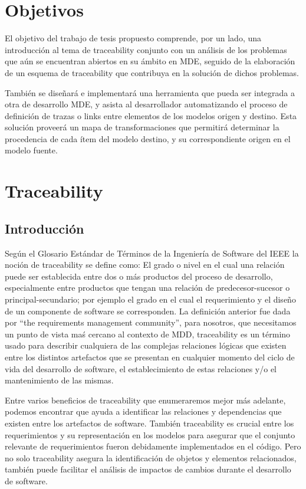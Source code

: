 \documentclass[a4paper,12pt,oneside]{book}
\begin{document}
\chapter{Objetivos}


El objetivo del trabajo de tesis propuesto comprende, por un lado, una introducción al tema de traceability conjunto con un análisis de los problemas que aún se encuentran abiertos en su ámbito en MDE, seguido de la elaboración de un esquema de traceability que contribuya en la solución de dichos problemas.

También se diseñará e implementará una herramienta que pueda ser integrada a otra de desarrollo MDE, y asista al desarrollador automatizando el proceso de definición de trazas o links entre elementos de los modelos origen y destino. Esta solución proveerá un mapa de transformaciones que permitirá determinar la procedencia de cada ítem del modelo destino, y su correspondiente origen en el modelo fuente.


\mainmatter
\chapter{Traceability}

\section{Introducción}

Según el Glosario Estándar de Términos de la Ingeniería de Software del IEEE \cite{IEEE} la noción de traceability se define como: El grado o nivel en el cual una relación puede ser establecida entre dos o más productos del proceso de desarrollo, especialmente entre productos que tengan una relación de predecesor-sucesor o principal-secundario; por ejemplo el grado en el cual el requerimiento y el diseño de un componente de software se corresponden. La definición anterior fue dada por “the requirements management community”, para nosotros, que necesitamos un punto de vista maś cercano al contexto de MDD, traceability es un término usado para describir cualquiera de las complejas relaciones lógicas que existen entre los distintos artefactos que se presentan en cualquier momento del ciclo de vida del desarrollo de software, el establecimiento de estas relaciones y/o el mantenimiento de las mismas.

Entre varios beneficios de traceability que enumeraremos mejor más adelante, podemos encontrar que ayuda a identificar las relaciones y dependencias que existen entre los artefactos de software. También traceability es crucial entre los requerimientos y su representación en los modelos para asegurar que el conjunto relevante de requerimientos fueron debidamente implementados en el código. Pero no solo traceability asegura la identificación de objetos y elementos relacionados, también puede facilitar el análisis de impactos de cambios durante el desarrollo de software.
\end{document}
